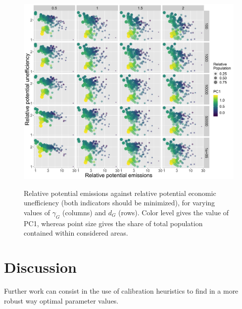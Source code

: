 \documentclass{jimis-en}
\begin{document}



\begin{figure}[ht] 
  {\includegraphics[width=\linewidth]{figures/aggreg_morpho_relemissions-relefficiency_colpc1_logscale.png}}
  \centering
  \label{fig:paretos-relative}
  \caption{Relative potential emissions against relative potential economic unefficiency (both indicators should be minimized), for varying values of $\gamma_G$ (columns) and $d_G$ (rows). Color level gives the value of PC1, whereas point size gives the share of total population contained within considered areas.}
\end{figure}







\section{Discussion}

Further work can consist in the use of calibration heuristics \citep{reuillon2013openmole} to find in a more robust way optimal parameter values.




\end{document}
